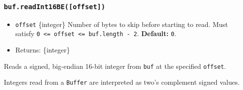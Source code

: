 \subsubsection{\texorpdfstring{\texttt{buf.readInt16BE({[}offset{]})}}{buf.readInt16BE({[}offset{]})}}\label{buf.readint16beoffset}

\begin{itemize}
\tightlist
\item
  \texttt{offset} \{integer\} Number of bytes to skip before starting to
  read. Must satisfy
  \texttt{0\ \textless{}=\ offset\ \textless{}=\ buf.length\ -\ 2}.
  \textbf{Default:} \texttt{0}.
\item
  Returns: \{integer\}
\end{itemize}

Reads a signed, big-endian 16-bit integer from \texttt{buf} at the
specified \texttt{offset}.

Integers read from a \texttt{Buffer} are interpreted as two's complement
signed values.

\begin{Shaded}
\begin{Highlighting}[]
\NormalTok{ \{ }\NormalTok{ \} } \OperatorTok{;}

\OperatorTok{=} \NormalTok{([}\OperatorTok{,} \NormalTok{])}\OperatorTok{;}

\NormalTok{(}\NormalTok{))}\OperatorTok{;}
\end{Highlighting}
\end{Shaded}

\begin{Shaded}
\begin{Highlighting}[]
\NormalTok{ \{ }\NormalTok{ \} }\OperatorTok{=} \NormalTok{(}\NormalTok{)}\OperatorTok{;}

\OperatorTok{=} \NormalTok{([}\OperatorTok{,} \NormalTok{])}\OperatorTok{;}

\NormalTok{(}\NormalTok{))}\OperatorTok{;}
\end{Highlighting}
\end{Shaded}


